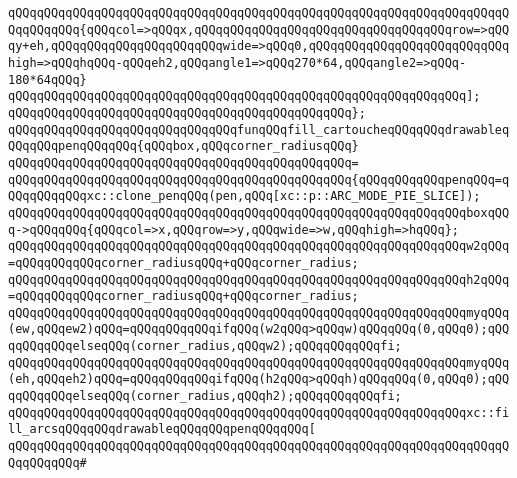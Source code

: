 \verb|qQQqqQQqqQQqqQQqqQQqqQQqqQQqqQQqqQQqqQQqqQQqqQQqqQQqqQQqqQQqqQQqqQQqqQQqqQQqqQQq{qQQqcol=>qQQqx,qQQqqQQqqQQqqQQqqQQqqQQqqQQqqQQqqQQqrow=>qQQqy+eh,qQQqqQQqqQQqqQQqqQQqqQQqwide=>qQQq0,qQQqqQQqqQQqqQQqqQQqqQQqqQQqhigh=>qQQqhqQQq-qQQqeh2,qQQqangle1=>qQQq270*64,qQQqangle2=>qQQq-180*64qQQq}|\newline
\verb|qQQqqQQqqQQqqQQqqQQqqQQqqQQqqQQqqQQqqQQqqQQqqQQqqQQqqQQqqQQqqQQq];|\newline
\verb|qQQqqQQqqQQqqQQqqQQqqQQqqQQqqQQqqQQqqQQqqQQqqQQq};|\newline
\newline
\verb|qQQqqQQqqQQqqQQqqQQqqQQqqQQqqQQqfunqQQqfill_cartoucheqQQqqQQqdrawableqQQqqQQqpenqQQqqQQq{qQQqbox,qQQqcorner_radiusqQQq}|\newline
\verb|qQQqqQQqqQQqqQQqqQQqqQQqqQQqqQQqqQQqqQQqqQQqqQQq=|\newline
\verb|qQQqqQQqqQQqqQQqqQQqqQQqqQQqqQQqqQQqqQQqqQQqqQQq{qQQqqQQqqQQqpenqQQq=qQQqqQQqqQQqxc::clone_penqQQq(pen,qQQq[xc::p::ARC_MODE_PIE_SLICE]);|\newline
\newline
\verb|qQQqqQQqqQQqqQQqqQQqqQQqqQQqqQQqqQQqqQQqqQQqqQQqqQQqqQQqqQQqqQQqboxqQQq->qQQqqQQq{qQQqcol=>x,qQQqrow=>y,qQQqwide=>w,qQQqhigh=>hqQQq};|\newline
\newline
\verb|qQQqqQQqqQQqqQQqqQQqqQQqqQQqqQQqqQQqqQQqqQQqqQQqqQQqqQQqqQQqqQQqw2qQQq=qQQqqQQqqQQqcorner_radiusqQQq+qQQqcorner_radius;|\newline
\verb|qQQqqQQqqQQqqQQqqQQqqQQqqQQqqQQqqQQqqQQqqQQqqQQqqQQqqQQqqQQqqQQqh2qQQq=qQQqqQQqqQQqcorner_radiusqQQq+qQQqcorner_radius;|\newline
\newline
\verb|qQQqqQQqqQQqqQQqqQQqqQQqqQQqqQQqqQQqqQQqqQQqqQQqqQQqqQQqqQQqqQQqmyqQQq(ew,qQQqew2)qQQq=qQQqqQQqqQQqifqQQq(w2qQQq>qQQqw)qQQqqQQq(0,qQQq0);qQQqqQQqqQQqelseqQQq(corner_radius,qQQqw2);qQQqqQQqqQQqfi;|\newline
\verb|qQQqqQQqqQQqqQQqqQQqqQQqqQQqqQQqqQQqqQQqqQQqqQQqqQQqqQQqqQQqqQQqmyqQQq(eh,qQQqeh2)qQQq=qQQqqQQqqQQqifqQQq(h2qQQq>qQQqh)qQQqqQQq(0,qQQq0);qQQqqQQqqQQqelseqQQq(corner_radius,qQQqh2);qQQqqQQqqQQqfi;|\newline
\newline
\verb|qQQqqQQqqQQqqQQqqQQqqQQqqQQqqQQqqQQqqQQqqQQqqQQqqQQqqQQqqQQqqQQqxc::fill_arcsqQQqqQQqdrawableqQQqqQQqpenqQQqqQQq[|\newline
\verb|qQQqqQQqqQQqqQQqqQQqqQQqqQQqqQQqqQQqqQQqqQQqqQQqqQQqqQQqqQQqqQQqqQQqqQQqqQQqqQQq#|\newline
